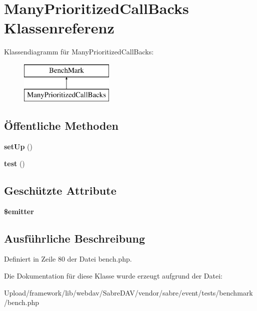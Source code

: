 \hypertarget{class_many_prioritized_call_backs}{}\section{Many\+Prioritized\+Call\+Backs Klassenreferenz}
\label{class_many_prioritized_call_backs}
Klassendiagramm für Many\+Prioritized\+Call\+Backs\+:\begin{figure}[H]
\begin{center}
\leavevmode
\includegraphics[height=2.000000cm]{class_many_prioritized_call_backs}
\end{center}
\end{figure}
\subsection*{Öffentliche Methoden}
\begin{DoxyCompactItemize}
\item 
\mbox{\label{class_many_prioritized_call_backs_ad47493c32e291597a286dfff4784474f}} 
{\bfseries set\+Up} ()
\item 
\mbox{\label{class_many_prioritized_call_backs_ac3ac0da1ad3afffe4de1d199c73fc8de}} 
{\bfseries test} ()
\end{DoxyCompactItemize}
\subsection*{Geschützte Attribute}
\begin{DoxyCompactItemize}
\item 
\mbox{\label{class_many_prioritized_call_backs_a3faa5c0191b81178d85d3b2add813555}} 
{\bfseries \$emitter}
\end{DoxyCompactItemize}


\subsection{Ausführliche Beschreibung}


Definiert in Zeile 80 der Datei bench.\+php.



Die Dokumentation für diese Klasse wurde erzeugt aufgrund der Datei\+:\begin{DoxyCompactItemize}
\item 
Upload/framework/lib/webdav/\+Sabre\+D\+A\+V/vendor/sabre/event/tests/benchmark/bench.\+php\end{DoxyCompactItemize}
